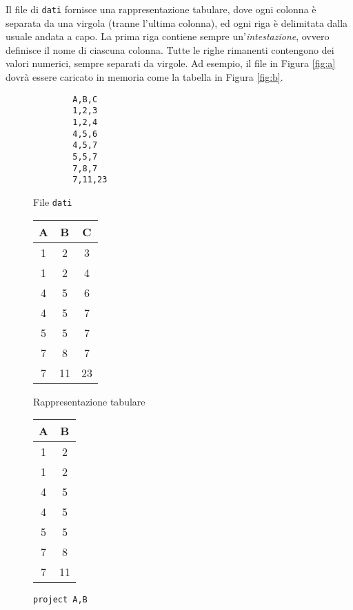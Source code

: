\documentclass[]{scrartcl}
\begin{document}
Il file di \texttt{dati} fornisce una rappresentazione tabulare,
dove ogni colonna è separata da una virgola (tranne l'ultima colonna), ed ogni riga è delimitata dalla usuale andata a capo.
La prima riga contiene sempre un'\textit{intestazione}, ovvero definisce il nome di ciascuna colonna. Tutte le righe rimanenti contengono dei valori numerici, sempre separati da virgole. Ad esempio, il file in Figura \ref{fig:a} 
dovrà essere caricato in memoria come la tabella in Figura \ref{fig:b}.

\begin{figure}[!b]
	\centering
	\begin{minipage}{.3\textwidth}
		\centering
		\begin{verbatim}
		A,B,C
		1,2,3
		1,2,4
		4,5,6
		4,5,7
		5,5,7
		7,8,7
		7,11,23
		\end{verbatim}
		\caption{File \texttt{dati}}
		\label{fig:a}
	\end{minipage}%
	\begin{minipage}{0.4\textwidth}
		\centering
		\begin{tabular}{ccc}
			\toprule
			A &B&C\\
			\midrule
			1&2&3\\
			1&2&4\\
			4&5&6\\
			4&5&7\\
			5&5&7\\
			7&8&7\\
			7&11&23\\
			\bottomrule
		\end{tabular}
	\caption{Rappresentazione tabulare }
		\label{fig:b}
	\end{minipage}\begin{minipage}{0.4\textwidth}
	\centering
	\begin{tabular}{cc}
		\toprule
		A &B\\
		\midrule
		1&2\\
		1&2\\
		4&5\\
		4&5\\
		5&5\\
		7&8\\
		7&11\\
		\bottomrule
	\end{tabular}
	\caption{\texttt{project A,B}}
	\label{fig:h}
\end{minipage}
\end{figure}
\end{document}
